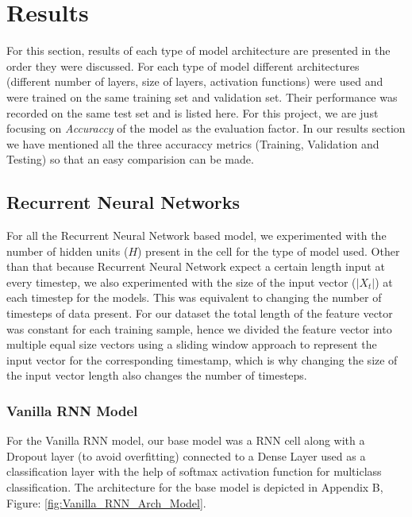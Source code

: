\documentclass[letterpaper, 12 pt, conference]{ieeeconf}  %
\begin{document}





\section{\textbf{Results}}
For this section, results of each type of model architecture are presented in the order they were discussed. For each type of model different architectures (different number of layers, size of layers, activation functions) were used and were trained on the same training set and validation set. Their performance was recorded on the same test set and is listed here. For this project, we are just focusing on \textit{Accuraccy} of the model as the evaluation factor. In our results section we have mentioned all the three accuraccy metrics (Training, Validation and Testing) so that an easy comparision can be made. 

\subsection{\textbf{Recurrent Neural Networks}}
For all the Recurrent Neural Network based model, we experimented with the number of hidden units ($H$) present in the cell for the type of model used. Other than that because Recurrent Neural Network expect a certain length input at every timestep, we also experimented with the size of the input vector ($|X_t|$) at each timestep for the models. This was equivalent to changing the number of timesteps of data present. For our dataset the total length of the feature vector was constant for each training sample, hence we divided the feature vector into multiple equal size vectors using a sliding window approach to represent the input vector for the corresponding timestamp, which is why changing the size of the input vector length also changes the number of timesteps.

\subsubsection{Vanilla RNN Model}
For the Vanilla RNN model, our base model was a RNN cell along with a Dropout layer (to avoid overfitting) connected to a Dense Layer used as a classification layer with the help of softmax activation function for multiclass classification. The architecture for the base model is depicted in Appendix B, Figure: \ref{fig:Vanilla_RNN_Arch_Model}. 
\end{document}

